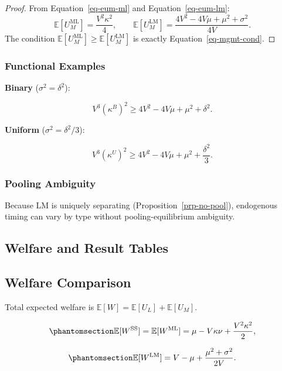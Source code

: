 \documentclass[
  english,
  a4paper,
  12pt]{article}
\newcommand{\E}{\mathbb{E}}
\theoremstyle{plain}
\theoremstyle{plain}
\theoremstyle{definition}
\theoremstyle{remark}
\begin{document}
\begin{proof}
From Equation~\ref{eq-eum-ml} and Equation~\ref{eq-eum-lm}: \[
\E\!\left[U_M^{\mathrm{ML}}\right]=\frac{V^2\kappa^2}{4},
\qquad
\E\!\left[U_M^{\mathrm{LM}}\right]=\frac{4V^2-4V\mu+\mu^2+\sigma^2}{4V}.
\] The condition \(\E[U_M^{\mathrm{ML}}]\ge\E[U_M^{\mathrm{LM}}]\) is
exactly Equation~\ref{eq-mgmt-cond}.
\end{proof}

\subsubsection{Functional Examples}\label{functional-examples}

\textbf{Binary} (\(\sigma^2=\delta^2\)):

\[
V^3(\kappa^B)^2 \ge 4V^2-4V\mu+\mu^2+\delta^2.
\]

\textbf{Uniform} (\(\sigma^2=\delta^2/3\)):

\[
V^3(\kappa^U)^2 \ge 4V^2-4V\mu+\mu^2+\frac{\delta^2}{3}.
\]

\subsubsection{Pooling Ambiguity}\label{pooling-ambiguity}

Because LM is uniquely separating (Proposition~\ref{prp-no-pool}),
endogenous timing can vary by type without pooling-equilibrium
ambiguity.

\subsection{Welfare and Result Tables}\label{sec-welfare}

\subsection{Welfare Comparison}\label{welfare-comparison}

Total expected welfare is \(\E[W]=\E[U_L]+\E[U_M]\).

\begin{equation}\phantomsection\label{eq-ew-ss}{
\E[W^{\mathrm{SS}}]=\E[W^{\mathrm{ML}}]
=\mu-V\kappa\nu+\frac{V^2\kappa^2}{2},
}\end{equation}

\begin{equation}\phantomsection\label{eq-ew-lm}{
\E[W^{\mathrm{LM}}]
=V-\mu+\frac{\mu^2+\sigma^2}{2V}.
}\end{equation}
\end{document}
